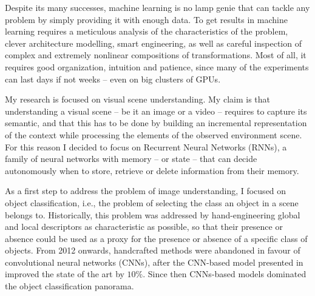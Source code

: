 Despite its many successes, machine learning is no lamp genie that can tackle
any problem by simply providing it with enough data. To get results in
machine learning requires a meticulous analysis of the characteristics of the
problem, clever architecture modelling, smart engineering, as well as careful
inspection of complex and extremely nonlinear compositions of transformations.
Most of all, it requires good organization, intuition and patience, since many
of the experiments can last days if not weeks -- even on big clusters of GPUs.

My research is focused on visual scene understanding. My claim is that
understanding a visual scene -- be it an image or a video -- requires to capture
its semantic, and that this has to be done by building an incremental
representation of the context while processing the elements of the observed environment scene. For
this reason I decided to focus on Recurrent Neural Networks (RNNs), a family
of neural networks with memory -- or state -- that can decide autonomously when
to store, retrieve or delete information from their memory.

As a first step to address the problem of image understanding, I focused on
object classification, i.e., the problem of selecting the class an object in a
scene belongs to. Historically, this problem was addressed by hand-engineering
global and local descriptors as characteristic as possible, so that their
presence or absence could be used as a proxy for the presence or absence of a
specific class of objects. From 2012 onwards, handcrafted methods were
abandoned in favour of convolutional neural networks (CNNs), after the
CNN-based model presented in~\cite{Krizhevsky-2012} improved the state of the
art by $10\%$. Since then CNNs-based models dominated the object classification
panorama.

